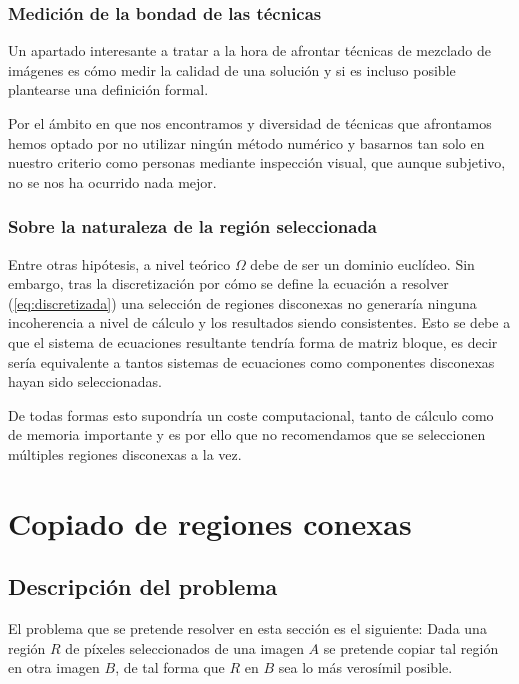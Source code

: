 \documentclass[11pt,twoside,titlepage,a4paper]{article}
\numberwithin{equation}{section} %
\theoremstyle{usual}
\begin{document}
\subsubsection{Medición de la bondad de las técnicas }

Un apartado interesante a tratar a la hora de afrontar técnicas de mezclado de imágenes es cómo medir la calidad de una solución y si es incluso posible plantearse una definición formal.   

Por el ámbito en que nos encontramos y diversidad de técnicas que afrontamos hemos optado por no utilizar ningún método numérico y basarnos tan solo en nuestro criterio como personas mediante inspección visual, que aunque subjetivo, no se nos ha ocurrido nada mejor. 

\subsubsection{Sobre la naturaleza de la región seleccionada}

Entre otras hipótesis, a nivel teórico $\Omega$ debe de ser un dominio euclídeo. Sin embargo, tras la discretización por cómo se define la ecuación a resolver  (\ref{eq:discretizada}) una selección de regiones disconexas no generaría ninguna incoherencia a nivel de cálculo y los resultados siendo consistentes. Esto se debe a que el sistema de ecuaciones resultante tendría forma de matriz bloque, es decir sería equivalente a tantos sistemas de ecuaciones como componentes disconexas hayan sido seleccionadas. 

De todas formas esto supondría un coste computacional, tanto de cálculo como de memoria importante y es por ello que no recomendamos que se seleccionen múltiples regiones disconexas a la vez. 

\newpage 
\section{Copiado de regiones conexas} 

\subsection{Descripción del problema}
El problema que se pretende resolver en esta sección es el siguiente:  Dada una región $R$ de píxeles seleccionados de una imagen $A$ se pretende copiar tal región en otra imagen $B$, de tal forma que $R$ en $B$ sea lo más verosímil posible.   
\end{document}
